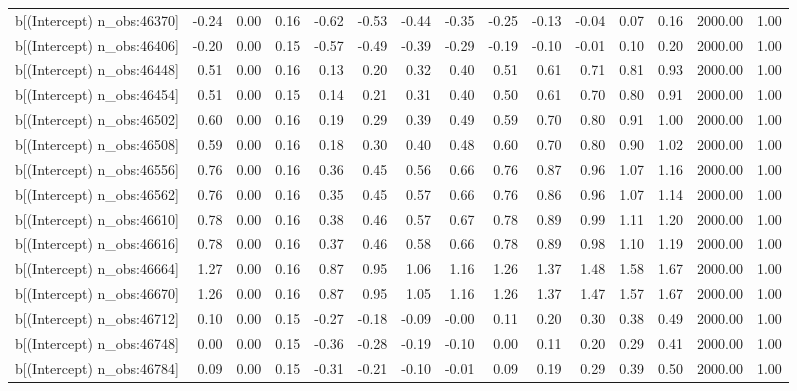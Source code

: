 \begin{table}[ht]
\begin{tabular}{rrrrrrrrrrrrrrr}
  b[(Intercept) n\_obs:46370] & -0.24 & 0.00 & 0.16 & -0.62 & -0.53 & -0.44 & -0.35 & -0.25 & -0.13 & -0.04 & 0.07 & 0.16 & 2000.00 & 1.00 \\ 
  b[(Intercept) n\_obs:46406] & -0.20 & 0.00 & 0.15 & -0.57 & -0.49 & -0.39 & -0.29 & -0.19 & -0.10 & -0.01 & 0.10 & 0.20 & 2000.00 & 1.00 \\ 
  b[(Intercept) n\_obs:46448] & 0.51 & 0.00 & 0.16 & 0.13 & 0.20 & 0.32 & 0.40 & 0.51 & 0.61 & 0.71 & 0.81 & 0.93 & 2000.00 & 1.00 \\ 
  b[(Intercept) n\_obs:46454] & 0.51 & 0.00 & 0.15 & 0.14 & 0.21 & 0.31 & 0.40 & 0.50 & 0.61 & 0.70 & 0.80 & 0.91 & 2000.00 & 1.00 \\ 
  b[(Intercept) n\_obs:46502] & 0.60 & 0.00 & 0.16 & 0.19 & 0.29 & 0.39 & 0.49 & 0.59 & 0.70 & 0.80 & 0.91 & 1.00 & 2000.00 & 1.00 \\ 
  b[(Intercept) n\_obs:46508] & 0.59 & 0.00 & 0.16 & 0.18 & 0.30 & 0.40 & 0.48 & 0.60 & 0.70 & 0.80 & 0.90 & 1.02 & 2000.00 & 1.00 \\ 
  b[(Intercept) n\_obs:46556] & 0.76 & 0.00 & 0.16 & 0.36 & 0.45 & 0.56 & 0.66 & 0.76 & 0.87 & 0.96 & 1.07 & 1.16 & 2000.00 & 1.00 \\ 
  b[(Intercept) n\_obs:46562] & 0.76 & 0.00 & 0.16 & 0.35 & 0.45 & 0.57 & 0.66 & 0.76 & 0.86 & 0.96 & 1.07 & 1.14 & 2000.00 & 1.00 \\ 
  b[(Intercept) n\_obs:46610] & 0.78 & 0.00 & 0.16 & 0.38 & 0.46 & 0.57 & 0.67 & 0.78 & 0.89 & 0.99 & 1.11 & 1.20 & 2000.00 & 1.00 \\ 
  b[(Intercept) n\_obs:46616] & 0.78 & 0.00 & 0.16 & 0.37 & 0.46 & 0.58 & 0.66 & 0.78 & 0.89 & 0.98 & 1.10 & 1.19 & 2000.00 & 1.00 \\ 
  b[(Intercept) n\_obs:46664] & 1.27 & 0.00 & 0.16 & 0.87 & 0.95 & 1.06 & 1.16 & 1.26 & 1.37 & 1.48 & 1.58 & 1.67 & 2000.00 & 1.00 \\ 
  b[(Intercept) n\_obs:46670] & 1.26 & 0.00 & 0.16 & 0.87 & 0.95 & 1.05 & 1.16 & 1.26 & 1.37 & 1.47 & 1.57 & 1.67 & 2000.00 & 1.00 \\ 
  b[(Intercept) n\_obs:46712] & 0.10 & 0.00 & 0.15 & -0.27 & -0.18 & -0.09 & -0.00 & 0.11 & 0.20 & 0.30 & 0.38 & 0.49 & 2000.00 & 1.00 \\ 
  b[(Intercept) n\_obs:46748] & 0.00 & 0.00 & 0.15 & -0.36 & -0.28 & -0.19 & -0.10 & 0.00 & 0.11 & 0.20 & 0.29 & 0.41 & 2000.00 & 1.00 \\ 
  b[(Intercept) n\_obs:46784] & 0.09 & 0.00 & 0.15 & -0.31 & -0.21 & -0.10 & -0.01 & 0.09 & 0.19 & 0.29 & 0.39 & 0.50 & 2000.00 & 1.00 \\ 

\end{tabular}
\end{table}
